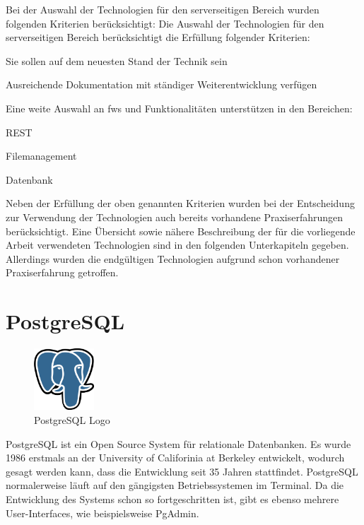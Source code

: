 Bei der Auswahl der Technologien für den serverseitigen Bereich wurden folgenden Kriterien berücksichtigt:
Die Auswahl der Technologien für den serverseitigen Bereich berücksichtigt die Erfüllung folgender Kriterien:
\begin{compactitem}
    \item Sie sollen auf dem neuesten Stand der Technik sein
    \item Ausreichende Dokumentation mit ständiger Weiterentwicklung verfügen
    \item Eine weite Auswahl an \glspl{fw} und Funktionalitäten unterstützen in den Bereichen:
    \begin{compactitem}
        \item REST
        \item Filemanagement
        \item Datenbank
    \end{compactitem}
\end{compactitem} 

Neben der Erfüllung der oben genannten Kriterien wurden bei der Entscheidung zur Verwendung der Technologien auch bereits vorhandene Praxiserfahrungen berücksichtigt. 
Eine Übersicht sowie nähere Beschreibung der für die vorliegende Arbeit verwendeten Technologien sind in den folgenden Unterkapiteln gegeben.
Allerdings wurden die endgültigen Technologien aufgrund schon vorhandener Praxiserfahrung getroffen. 



\section{PostgreSQL}
\begin{figure}
  \begin{center}
      \includegraphics[width=0.2\textwidth]{pics/logos/postgres.png}
      \caption{PostgreSQL Logo}
  \end{center}
\end{figure}
PostgreSQL ist ein Open Source System für relationale Datenbanken. 
Es wurde 1986 erstmals an der University of Califorinia at Berkeley entwickelt, wodurch gesagt werden kann, dass die Entwicklung seit 35 Jahren stattfindet. 
PostgreSQL normalerweise läuft auf den gängigsten Betriebssystemen im Terminal.
Da die Entwicklung des Systems schon so fortgeschritten ist, gibt es ebenso mehrere User-Interfaces, wie beispielsweise PgAdmin. 
\cite{PostgreSQLAbout}

